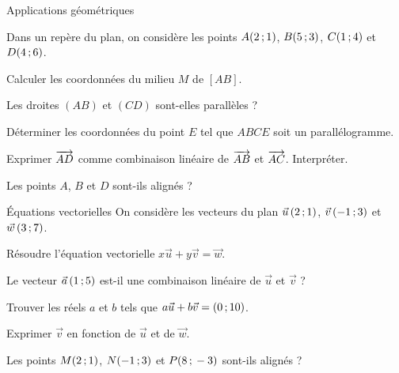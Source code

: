 \begin{exercice}[2]{Applications géométriques}
\begin{codecote}[0.56]
Dans un repère du plan, on considère les points $A(2\,{;}\,1)$, $B(5\,{;}\,3)$, $C(1\,{;}\,4)$ et $D(4\,{;}\,6)$.
\begin{questions}
  \item Calculer les coordonnées du milieu $M$ de $[AB]$.
  \item Les droites $(AB)$ et $(CD)$ sont-elles parallèles ?
  \item Déterminer les coordonnées du point $E$ tel que $ABCE$ soit un parallélogramme.
  \item Exprimer $\overrightarrow{AD}$ comme combinaison linéaire de $\overrightarrow{AB}$ et $\overrightarrow{AC}$. Interpréter.
  \item Les points $A$, $B$ et $D$ sont-ils alignés ?
\end{questions}
\cote
\centering
{}
\end{codecote}
\end{exercice}

\begin{exercice}[2]{Équations vectorielles}
On considère les vecteurs du plan $\vec u\,(2\,{;}\,1)$, $\vec v\,(-1\,{;}\,3)$ et $\vec w\,(3\,{;}\,7)$.
\begin{questions}
  \item Résoudre l'équation vectorielle $x\vec u+y\vec v=\vec w$.
  \item Le vecteur $\vec a\,(1\,{;}\,5)$ est-il une combinaison linéaire de $\vec u$ et $\vec v$ ?
  \item Trouver les réels $a$ et $b$ tels que $a\vec u+b\vec v=(0\,{;}\,10)$.
  \item Exprimer $\vec v$ en fonction de $\vec u$ et de $\vec w$.
  \item Les points $M(2\,{;}\,1)$, $N(-1\,{;}\,3)$ et $P(8\,{;}\,-3)$ sont-ils alignés ?
\end{questions}
\end{exercice}

